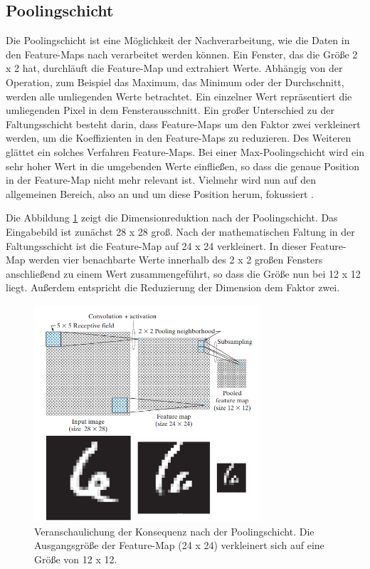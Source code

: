 \subsection{Poolingschicht}
\label{sec:poolingschicht}

Die Poolingschicht ist eine Möglichkeit der Nachverarbeitung, wie die Daten in den Feature-Maps nach verarbeitet werden können\cite{francois}. Ein Fenster, das die Größe 2 x 2 hat, durchläuft die Feature-Map und extrahiert Werte. Abhängig von der Operation, zum Beispiel das Maximum, das Minimum oder der Durchschnitt, werden alle umliegenden Werte betrachtet. Ein einzelner Wert repräsentiert die umliegenden Pixel in dem Fensterausschnitt\cite{IntroML}. Ein großer Unterschied zu der Faltungsschicht besteht darin, dass Feature-Maps um den Faktor zwei verkleinert werden, um die Koeffizienten in den Feature-Maps zu reduzieren\cite{francois}. Des Weiteren glättet ein solches Verfahren Feature-Maps. Bei einer Max-Poolingschicht wird ein sehr hoher Wert in die umgebenden Werte einfließen, so dass die genaue Position in der Feature-Map nicht mehr relevant ist. Vielmehr wird nun auf den allgemeinen Bereich, also an und um diese Position herum, fokussiert \cite{IntroML}.


Die Abbildung \ref{cnn_pooling_example} zeigt die Dimensionreduktion nach der Poolingschicht. Das Eingabebild ist zunächst 28 x 28 groß. Nach der mathematischen Faltung in der Faltungsschicht ist die Feature-Map auf 24 x 24 verkleinert. In dieser Feature-Map werden vier benachbarte Werte innerhalb des 2 x 2 großen Fensters anschließend zu einem Wert zusammengeführt, so dass die Größe nun bei 12 x 12 liegt. Außerdem entspricht die Reduzierung der Dimension dem Faktor zwei.


\begin{figure}[h!]
	\centering
	\includegraphics[width=0.75\textwidth]{bilder/convolution_example2.PNG}
	\caption{Veranschaulichung der Konsequenz nach der Poolingschicht. Die Ausgangsgröße der Feature-Map (24 x 24) verkleinert sich auf eine Größe von 12 x 12\cite{Gonzalez2018}.}
	\label{cnn_pooling_example}
\end{figure}




